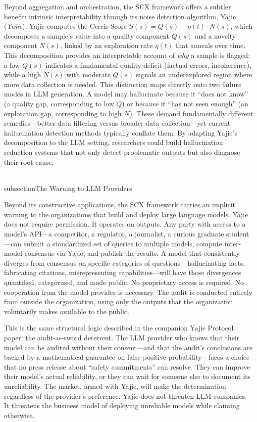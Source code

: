 \documentclass[11pt,twocolumn]{article}
\begin{document}
Beyond aggregation and orchestration, the SCX framework offers a subtler benefit: intrinsic interpretability through its noise detection algorithm, Yajie (\emph{Yajie}). Yajie computes the Cercis Score $S(s) = Q(s) + \eta(t) \cdot N(s)$, which decomposes a sample's value into a quality component $Q(s)$ and a novelty component $N(s)$, linked by an exploration rate $\eta(t)$ that anneals over time. This decomposition provides an interpretable account of \textit{why} a sample is flagged: a low $Q(s)$ indicates a fundamental quality deficit (factual errors, incoherence), while a high $N(s)$ with moderate $Q(s)$ signals an underexplored region where more data collection is needed. This distinction maps directly onto two failure modes in LLM generation. A model may hallucinate because it ``does not know'' (a quality gap, corresponding to low $Q$) or because it ``has not seen enough'' (an exploration gap, corresponding to high $N$). These demand fundamentally different remedies---better data filtering versus broader data collection---yet current hallucination detection methods typically conflate them. By adapting Yajie's decomposition to the LLM setting, researchers could build hallucination reduction systems that not only detect problematic outputs but also diagnose their root cause.

\\subsection{The Warning to LLM Providers}

Beyond its constructive applications, the SCX framework carries an implicit warning to the organizations that build and deploy large language models. Yajie does not require permission. It operates on outputs. Any party with access to a model's API—a competitor, a regulator, a journalist, a curious graduate student—can submit a standardized set of queries to multiple models, compute inter-model consensus via Yajie, and publish the results. A model that consistently diverges from consensus on specific categories of questions—hallucinating facts, fabricating citations, misrepresenting capabilities—will have those divergences quantified, categorized, and made public. No proprietary access is required. No cooperation from the model provider is necessary. The audit is conducted entirely from outside the organization, using only the outputs that the organization voluntarily makes available to the public.

This is the same structural logic described in the companion Yajie Protocol paper: the audit-as-sword deterrent. The LLM provider who knows that their model can be audited without their consent—and that the audit's conclusions are backed by a mathematical guarantee on false-positive probability—faces a choice that no press release about ``safety commitments'' can resolve. They can improve their model's actual reliability, or they can wait for someone else to document its unreliability. The market, armed with Yajie, will make the determination regardless of the provider's preference. Yajie does not threaten LLM companies. It threatens the business model of deploying unreliable models while claiming otherwise.
\end{document}
